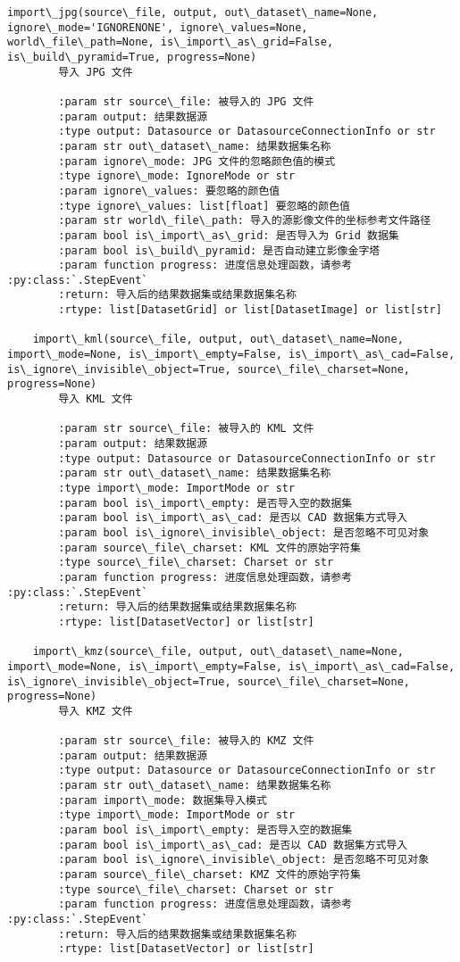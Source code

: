 \documentclass[11pt]{article}
\begin{document}
\begin{Verbatim}[commandchars=\\\{\}]
    import\_jpg(source\_file, output, out\_dataset\_name=None, ignore\_mode='IGNORENONE', ignore\_values=None, world\_file\_path=None, is\_import\_as\_grid=False, is\_build\_pyramid=True, progress=None)
        导入 JPG 文件
        
        :param str source\_file: 被导入的 JPG 文件
        :param output: 结果数据源
        :type output: Datasource or DatasourceConnectionInfo or str
        :param str out\_dataset\_name: 结果数据集名称
        :param ignore\_mode: JPG 文件的忽略颜色值的模式
        :type ignore\_mode: IgnoreMode or str
        :param ignore\_values: 要忽略的颜色值
        :type ignore\_values: list[float] 要忽略的颜色值
        :param str world\_file\_path: 导入的源影像文件的坐标参考文件路径
        :param bool is\_import\_as\_grid: 是否导入为 Grid 数据集
        :param bool is\_build\_pyramid: 是否自动建立影像金字塔
        :param function progress: 进度信息处理函数，请参考 :py:class:`.StepEvent`
        :return: 导入后的结果数据集或结果数据集名称
        :rtype: list[DatasetGrid] or list[DatasetImage] or list[str]
    
    import\_kml(source\_file, output, out\_dataset\_name=None, import\_mode=None, is\_import\_empty=False, is\_import\_as\_cad=False, is\_ignore\_invisible\_object=True, source\_file\_charset=None, progress=None)
        导入 KML 文件
        
        :param str source\_file: 被导入的 KML 文件
        :param output: 结果数据源
        :type output: Datasource or DatasourceConnectionInfo or str
        :param str out\_dataset\_name: 结果数据集名称
        :type import\_mode: ImportMode or str
        :param bool is\_import\_empty: 是否导入空的数据集
        :param bool is\_import\_as\_cad: 是否以 CAD 数据集方式导入
        :param bool is\_ignore\_invisible\_object: 是否忽略不可见对象
        :param source\_file\_charset: KML 文件的原始字符集
        :type source\_file\_charset: Charset or str
        :param function progress: 进度信息处理函数，请参考 :py:class:`.StepEvent`
        :return: 导入后的结果数据集或结果数据集名称
        :rtype: list[DatasetVector] or list[str]
    
    import\_kmz(source\_file, output, out\_dataset\_name=None, import\_mode=None, is\_import\_empty=False, is\_import\_as\_cad=False, is\_ignore\_invisible\_object=True, source\_file\_charset=None, progress=None)
        导入 KMZ 文件
        
        :param str source\_file: 被导入的 KMZ 文件
        :param output: 结果数据源
        :type output: Datasource or DatasourceConnectionInfo or str
        :param str out\_dataset\_name: 结果数据集名称
        :param import\_mode: 数据集导入模式
        :type import\_mode: ImportMode or str
        :param bool is\_import\_empty: 是否导入空的数据集
        :param bool is\_import\_as\_cad: 是否以 CAD 数据集方式导入
        :param bool is\_ignore\_invisible\_object: 是否忽略不可见对象
        :param source\_file\_charset: KMZ 文件的原始字符集
        :type source\_file\_charset: Charset or str
        :param function progress: 进度信息处理函数，请参考 :py:class:`.StepEvent`
        :return: 导入后的结果数据集或结果数据集名称
        :rtype: list[DatasetVector] or list[str]
    

\end{Verbatim}
\end{document}
